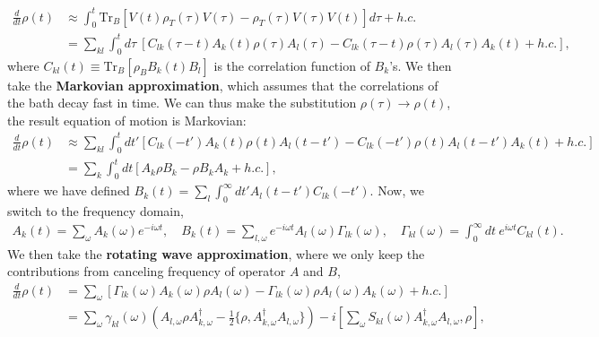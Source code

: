 \documentclass{SciPost}
\begin{document}
\begin{equation}
\begin{aligned}
	\frac{d}{dt} \rho(t) 
	&\approx  \int_0^t \mathrm{Tr}_B\left[ V(t) \rho_T(\tau) V(\tau)- \rho_T(\tau) V(\tau) V(t) \right]d\tau +h.c. \\
	&= \sum_{kl}\int_0^t d\tau\ \left[C_{lk}(\tau - t) A_k(t)\rho(\tau)A_l(\tau) -  C_{lk}(\tau - t)\rho(\tau)A_l(\tau)A_k(t)+h.c.\right],
\end{aligned}
\end{equation}
where $C_{kl}(t) \equiv \mathrm{Tr}_B[\rho_B B_k(t) B_l ]$ is the correlation function of $B_k$'s.  We then take the \textbf{Markovian approximation}, which assumes that the correlations of the bath decay fast in time. We can thus make the substitution $\rho(\tau) \rightarrow \rho(t)$, the result equation of motion is Markovian:
\begin{equation}
\begin{aligned}
	\frac{d}{dt} \rho(t) &\approx \sum_{kl}\int_{0}^{t}dt' \left[C_{lk}(-t') A_k(t)\rho(t)A_l(t-t') - C_{lk}(-t')\rho(t)A_l(t-t')A_k(t)+h.c.\right] \\
	&= \sum_{k} \int_0^t dt \left[A_k \rho B_{k}-\rho B_{k} A_k+h.c.\right],
\end{aligned}
\end{equation}
where we have defined $B_{k}(t) = \sum_l \int_0^{\infty} dt' A_l(t-t')C_{lk}(-t')$. Now, we switch to the frequency domain,
\begin{equation*}
\begin{aligned}
	A_k(t) = \sum_\omega A_{k}(\omega) e^{-i\omega t}, \quad
	B_k(t) = \sum_{l,\omega} e^{-i\omega t} A_l(\omega)\Gamma_{lk}(\omega), \quad
	\Gamma_{kl}(\omega) = \int_0^\infty dt\ e^{i\omega t}C_{kl}(t).
\end{aligned}
\end{equation*}
We then take the \textbf{rotating wave approximation}, where we only keep the contributions from canceling frequency of operator $A$ and $B$,
\begin{equation}
\begin{aligned}
	\frac{d}{dt}\rho(t) &= \sum_{\omega} \left[\Gamma_{lk}(\omega) A_k(\omega) \rho A_l(\omega) - \Gamma_{lk}(\omega)\rho A_l(\omega) A_k(\omega) + h.c. \right] \\
	&= \sum_{\omega} \gamma_{kl}(\omega)(A_{l,\omega}\rho A_{k,\omega}^\dagger-\frac{1}{2}\{\rho,A_{k,\omega}^\dagger A_{l,\omega}\}) -i\left[\sum_{\omega}S_{kl}(\omega)A_{k,\omega}^\dagger A_{l,\omega},\rho\right],
\end{aligned}
\end{equation}
\end{document}
